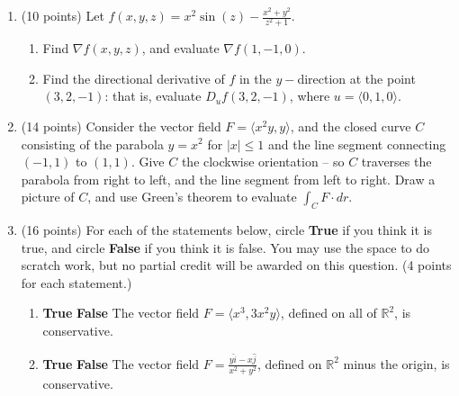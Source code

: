 \documentclass[12 pt]{report}
\begin{document}
\newpage
\begin{enumerate}

\item (10 points) Let $f(x,y,z) = x^2 \sin(z) - \frac{x^2+y^2}{z^2 + 1}$. 

\begin{enumerate} \item Find $\nabla f(x,y,z)$, and evaluate $\nabla{f}(1,-1, 0)$. 

\vfill

\item Find the directional derivative of $f$ in the $y-$direction at the point $(3, 2, -1)$: that is, evaluate $D_{u}f(3, 2, -1)$, where $u = \langle 0, 1, 0 \rangle$. 

\end{enumerate} 

\vfill

\newpage

\item (14 points) Consider the vector field $F = \langle x^2y, y \rangle$, and the closed curve $C$ consisting of the parabola $y=x^2$ for $|x| \leq 1$ and the line segment connecting $(-1,1)$ to $(1,1)$. Give $C$ the clockwise orientation -- so $C$ traverses the parabola from right to left, and the line segment from left to right. Draw a picture of $C$, and use Green's theorem to evaluate $\int_C F \cdot dr$. 

\newpage


\item (16 points) For each of the statements below, circle \textbf{True} if you think it is true, and circle \textbf{False} if you think it is false. You may use the space to do scratch work, but no partial credit will be awarded on this question. (4 points for each statement.)

\begin{enumerate} 
\item \textbf{True} \hspace{5pt} \textbf{False} \hspace{10pt} The vector field $F = \langle x^3, 3x^2 y  \rangle$, defined on all of $\mathbb{R}^2$, is conservative. 

\vfill

\item \textbf{True} \hspace{5pt} \textbf{False} \hspace{10pt} The vector field $F = \frac{y \hat{i} - x \hat{j}}{x^2+y^2}$, defined on $\mathbb{R}^2$ minus the origin, is conservative.


\end{enumerate}
\end{enumerate}
\end{document}
